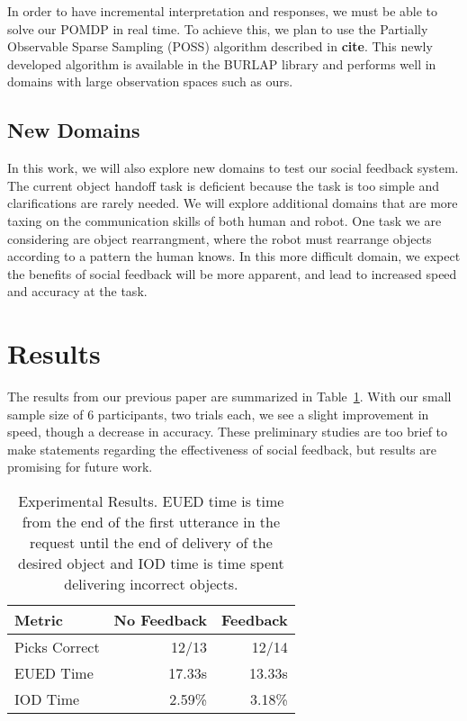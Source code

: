 \documentclass{article}
\begin{document}
In order to have incremental interpretation and responses, we must be able to solve our POMDP in real time. To achieve this, we plan to use the Partially Observable Sparse Sampling (POSS) algorithm described in \textbf{cite}. This newly developed algorithm is available in the BURLAP library and performs well in domains with large observation spaces such as ours. 


\subsection{New Domains}

In this work, we will also explore new domains to test our social feedback system. The current object handoff task is deficient because the task is too simple and clarifications are rarely needed. We will explore additional domains that are more taxing on the communication skills of both human and robot. One task we are considering are object rearrangment, where the robot must rearrange objects according to a pattern the human knows. In this more difficult domain, we expect the benefits of social feedback will be more apparent, and lead to increased speed and accuracy at the task. 

\section{Results}

The results from our previous paper are summarized in Table~\ref{table:expResults}. With our small sample size of 6 participants, two trials each, we see a slight improvement in speed, though a decrease in accuracy. These preliminary studies are too brief to make statements regarding the effectiveness of social feedback, but results are promising for future work. 

\begin{table}
\begin{center}
\begin{tabular}{lrr}
\hline
Metric & No Feedback & Feedback \\
\hline
Picks Correct & 12/13 & 12/14\\
EUED Time & 17.33s & 13.33s\\
IOD Time & 2.59\% & 3.18\%\\
\hline
\end{tabular}
\caption{\label{table:expResults} Experimental Results. EUED time is time from
the end of the first utterance in the request until the end of delivery of the
desired object and IOD time is time spent delivering incorrect objects.}
\end{center}
\end{table}
\end{document}
